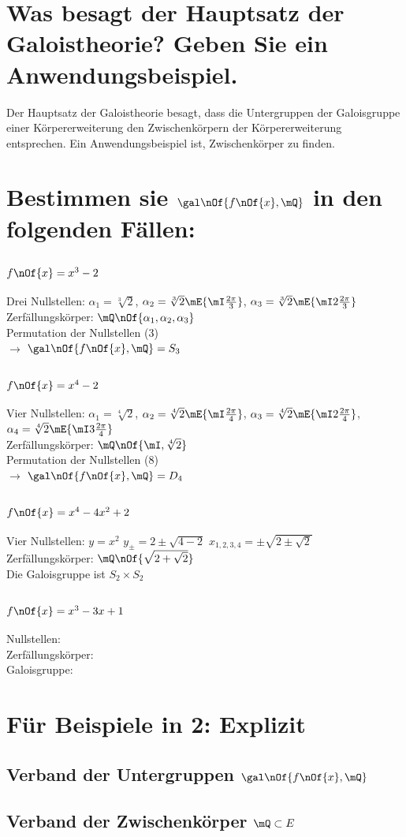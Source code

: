 \documentclass[11pt,a4paper]{scrartcl}
\begin{document}
\section{Was besagt der Hauptsatz der Galoistheorie? Geben Sie ein Anwendungsbeispiel.}
Der Hauptsatz der Galoistheorie besagt, dass die Untergruppen der Galoisgruppe einer Körpererweiterung den Zwischenkörpern der Körpererweiterung entsprechen. Ein Anwendungsbeispiel ist, Zwischenkörper zu finden.
\section{Bestimmen sie $\gal\nOf{f\nOf{x},\mQ}$ in den folgenden Fällen:}
\subsection{$f\nOf{x} = x^3-2 $}
Drei Nullstellen: $\alpha_1 = \sqrt[3]{2}$, $\alpha_2 = \sqrt[3]{2} \mE{\mI  \frac{2\pi}{3}}$, $\alpha_3 = \sqrt[3]{2} \mE{\mI 2 \frac{2\pi}{3}}$\\
Zerfällungskörper: $\mQ\nOf{\alpha_1,\alpha_2,\alpha_3}$\\
Permutation der Nullstellen (3)\\
$\rightarrow$ $\gal\nOf{f\nOf{x},\mQ} = S_3$
\subsection{$f\nOf{x} = x^4-2$}
Vier Nullstellen: $\alpha_1 = \sqrt[4]{2}$, $\alpha_2 = \sqrt[4]{2} \mE{\mI \frac{2\pi}{4}}$, $\alpha_3 = \sqrt[4]{2} \mE{\mI 2 \frac{2\pi}{4}}$, $\alpha_4 = \sqrt[4]{2} \mE{\mI 3 \frac{2\pi}{4}}$\\
Zerfällungskörper: $\mQ\nOf{\mI,\sqrt[4]{2}}$ \\
Permutation der Nullstellen (8) \\
$\rightarrow$ $\gal\nOf{f\nOf{x},\mQ} = D_4$
\subsection{$f\nOf{x} = x^4 - 4 x^2 + 2$}
Vier Nullstellen: $y=x^2$ $y_{\pm} = 2 \pm \sqrt{4-2}$ $x_{1,2,3,4} = \pm \sqrt{2 \pm \sqrt{2}}$ \\
Zerfällungskörper: $\mQ\nOf{\sqrt{2 + \sqrt{2}}}$ \\
Die Galoisgruppe ist $S_2 \times S_2$
\subsection{$f\nOf{x} = x^3 - 3x + 1$}
Nullstellen: \\
Zerfällungskörper: \\
Galoisgruppe:
\section{Für Beispiele in 2: Explizit}
\subsection{Verband der Untergruppen $\gal\nOf{f\nOf{x},\mQ}$}
\subsection{Verband der Zwischenkörper $\mQ \subset E$}
\end{document}

